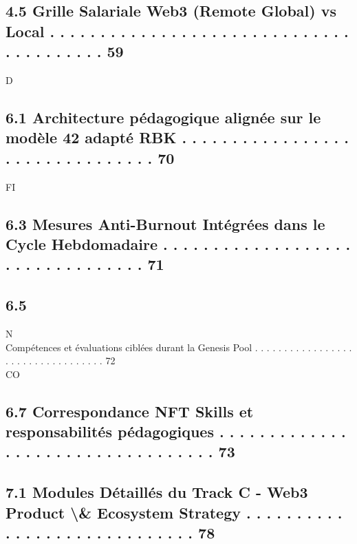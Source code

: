 \subsection{4.5 Grille Salariale Web3 (Remote Global) vs Local . . . . . . . . . . . . . . . . . . . . . . . . . . . . . . . . . . . . . . . .      59}
\vspace{0.5em}
\vspace{0.5em}
\vspace{0.5em}
\vspace{0.5em}
D\\
\subsection{6.1   Architecture pédagogique alignée sur le modèle 42 adapté RBK . . . . . . . . . . . . . . . . . . . . . . . . . . . . . . . .      70}
\vspace{0.5em}
\vspace{0.5em}
\vspace{0.5em}
\vspace{0.5em}
FI\\
\subsection{6.3   Mesures Anti-Burnout Intégrées dans le Cycle Hebdomadaire . . . . . . . . . . . . . . . . . . . . . . . . . . . . . . . . .       71}
\subsection{6.5}
N\\
Compétences et évaluations ciblées durant la Genesis Pool . . . . . . . . . . . . . . . . . . . . . . . . . . . . . . . . . .     72\\
CO\\
\subsection{6.7   Correspondance NFT Skills et responsabilités pédagogiques . . . . . . . . . . . . . . . . . . . . . . . . . . . . . . . . . .     73}
\vspace{0.5em}
\subsection{7.1 Modules Détaillés du Track C - Web3 Product \textbackslash{}& Ecosystem Strategy . . . . . . . . . . . . . . . . . . . . . . . . . . . . .          78}
